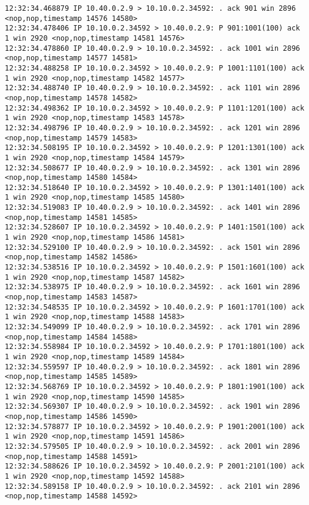 \documentclass[a4paper,12pt]{article}
\begin{document}
\begin{lstlisting}
12:32:34.468879 IP 10.40.0.2.9 > 10.10.0.2.34592: . ack 901 win 2896 <nop,nop,timestamp 14576 14580>
12:32:34.478406 IP 10.10.0.2.34592 > 10.40.0.2.9: P 901:1001(100) ack 1 win 2920 <nop,nop,timestamp 14581 14576>
12:32:34.478860 IP 10.40.0.2.9 > 10.10.0.2.34592: . ack 1001 win 2896 <nop,nop,timestamp 14577 14581>
12:32:34.488258 IP 10.10.0.2.34592 > 10.40.0.2.9: P 1001:1101(100) ack 1 win 2920 <nop,nop,timestamp 14582 14577>
12:32:34.488740 IP 10.40.0.2.9 > 10.10.0.2.34592: . ack 1101 win 2896 <nop,nop,timestamp 14578 14582>
12:32:34.498362 IP 10.10.0.2.34592 > 10.40.0.2.9: P 1101:1201(100) ack 1 win 2920 <nop,nop,timestamp 14583 14578>
12:32:34.498796 IP 10.40.0.2.9 > 10.10.0.2.34592: . ack 1201 win 2896 <nop,nop,timestamp 14579 14583>
12:32:34.508195 IP 10.10.0.2.34592 > 10.40.0.2.9: P 1201:1301(100) ack 1 win 2920 <nop,nop,timestamp 14584 14579>
12:32:34.508677 IP 10.40.0.2.9 > 10.10.0.2.34592: . ack 1301 win 2896 <nop,nop,timestamp 14580 14584>
12:32:34.518640 IP 10.10.0.2.34592 > 10.40.0.2.9: P 1301:1401(100) ack 1 win 2920 <nop,nop,timestamp 14585 14580>
12:32:34.519083 IP 10.40.0.2.9 > 10.10.0.2.34592: . ack 1401 win 2896 <nop,nop,timestamp 14581 14585>
12:32:34.528607 IP 10.10.0.2.34592 > 10.40.0.2.9: P 1401:1501(100) ack 1 win 2920 <nop,nop,timestamp 14586 14581>
12:32:34.529100 IP 10.40.0.2.9 > 10.10.0.2.34592: . ack 1501 win 2896 <nop,nop,timestamp 14582 14586>
12:32:34.538516 IP 10.10.0.2.34592 > 10.40.0.2.9: P 1501:1601(100) ack 1 win 2920 <nop,nop,timestamp 14587 14582>
12:32:34.538975 IP 10.40.0.2.9 > 10.10.0.2.34592: . ack 1601 win 2896 <nop,nop,timestamp 14583 14587>
12:32:34.548535 IP 10.10.0.2.34592 > 10.40.0.2.9: P 1601:1701(100) ack 1 win 2920 <nop,nop,timestamp 14588 14583>
12:32:34.549099 IP 10.40.0.2.9 > 10.10.0.2.34592: . ack 1701 win 2896 <nop,nop,timestamp 14584 14588>
12:32:34.558984 IP 10.10.0.2.34592 > 10.40.0.2.9: P 1701:1801(100) ack 1 win 2920 <nop,nop,timestamp 14589 14584>
12:32:34.559597 IP 10.40.0.2.9 > 10.10.0.2.34592: . ack 1801 win 2896 <nop,nop,timestamp 14585 14589>
12:32:34.568769 IP 10.10.0.2.34592 > 10.40.0.2.9: P 1801:1901(100) ack 1 win 2920 <nop,nop,timestamp 14590 14585>
12:32:34.569307 IP 10.40.0.2.9 > 10.10.0.2.34592: . ack 1901 win 2896 <nop,nop,timestamp 14586 14590>
12:32:34.578877 IP 10.10.0.2.34592 > 10.40.0.2.9: P 1901:2001(100) ack 1 win 2920 <nop,nop,timestamp 14591 14586>
12:32:34.579505 IP 10.40.0.2.9 > 10.10.0.2.34592: . ack 2001 win 2896 <nop,nop,timestamp 14588 14591>
12:32:34.588626 IP 10.10.0.2.34592 > 10.40.0.2.9: P 2001:2101(100) ack 1 win 2920 <nop,nop,timestamp 14592 14588>
12:32:34.589158 IP 10.40.0.2.9 > 10.10.0.2.34592: . ack 2101 win 2896 <nop,nop,timestamp 14588 14592>

\end{lstlisting}
\end{document}

